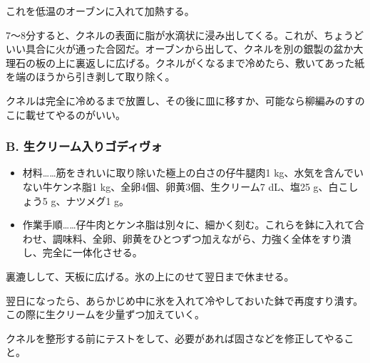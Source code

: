 \begin{recette}
これを低温のオーブンに入れて加熱する。

7〜8分すると、クネルの表面に脂が水滴状に浸み出してくる。これが、ちょうどいい具合に火が通った合図だ。オーブンから出して、クネルを別の銀製の盆か大理石の板の上に裏返しに広げる。クネルがくなるまで冷めたら、敷いてあった紙を端のほうから引き剥して取り除く。

クネルは完全に冷めるまで放置し、その後に皿に移すか、可能なら柳編みのすのこに載せてやるのがいい。

\hypertarget{godiveau-a-la-creme}{%
\subsubsection{B. 生クリーム入りゴディヴォ}\label{godiveau-a-la-creme}}



\begin{itemize}
\item
  材料\ldots{}\ldots{}筋をきれいに取り除いた極上の白さの仔牛腿肉1
  kg、水気を含んでいない牛ケンネ脂1 kg、全卵4個、卵黄3個、生クリーム7
  dL、塩25 g、白こしょう5 g、ナツメグ1 g。
\item
  作業手順\ldots{}\ldots{}仔牛肉とケンネ脂は別々に、細かく刻む。これらを鉢に入れて合わせ、調味料、全卵、卵黄をひとつずつ加えながら、力強く全体をすり潰し、完全に一体化させる。
\end{itemize}

裏漉しして、天板に広げる。氷の上にのせて翌日まで休ませる。

翌日になったら、あらかじめ中に氷を入れて冷やしておいた鉢で再度すり潰す。この際に生クリームを少量ずつ加えていく。

クネルを整形する前にテストをして、必要があれば固さなどを修正してやること。

\hypertarget{godiveau-lyonnais}{%
}
\end{recette}
